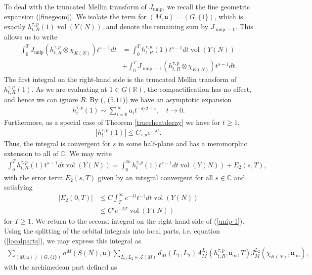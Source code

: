 \documentclass[11pt,reqno]{amsart}
\numberwithin{equation}{section}
\theoremstyle{definition}
\theoremstyle{remark}
\newcommand{\vol}{\operatorname{vol}}
\newcommand{\unip}{\operatorname{unip}}
\newcommand{\mf}[1]{\mathfrak{#1}}
\newcommand{\C}{\mathbb{C}}
\newcommand{\R}{\mathbb{R}}
\begin{document}
To deal with the truncated Mellin transform of $J_{\unip}$, we recall the fine geometric expansion (\ref{finegeom}). We isolate the term for $(M,\mf{u})=(G,\lbrace 1\rbrace)$, which is exactly $h^{\tau,p}_{t,R}(1)\vol(Y(N))$, and denote the remaining sum by $J_{\unip-1}$. This allows us to write
\begin{align}\label{unip-1}
    \int_0^T J_{\unip}(h^{\tau,p}_{t,R}\otimes\chi_{K(N)})t^{s-1}dt &= \int_0^T h_{t,R}^{\tau,p}(1)t^{s-1}dt \vol(Y(N)) \\
    &+\int_0^T J_{\unip-1}(h^{\tau,p}_{t,R}\otimes\chi_{K(N)})t^{s-1}dt .
\end{align}
The first integral on the right-hand side is the truncated Mellin transform of $h_{t,R}^{\tau,p}(1)$. As we are evaluating at $1\in G(\R)$, the compactification has no effect, and hence we can ignore $R$. By (\cite{MzM1}, ($5.11$)) we have an asymptotic expansion
\begin{align*}
    h_t^{\tau,p}(1)\sim \sum_{i=0}^\infty a_i t^{-d/2+i}, \quad t\to 0.
\end{align*}
Furthermore, as a special case of Theorem \ref{traceheatdecay} we have for $t\geq 1$,
\begin{align*}
    |h_t^{\tau,p}(1)|\leq C_{\tau,p}e^{-\lambda t}.
\end{align*}
Thus, the integral is convergent for $s$ in some half-plane and has a meromorphic extension to all of $\C$. We may write
\begin{align*}
    \int_0^T h_{t,R}^{\tau,p}(1)t^{s-1}dt \vol(Y(N)) = \int_0^\infty h_t^{\tau,p}(1)t^{s-1}dt \vol(Y(N)) + E_2(s,T),
\end{align*}
with the error term $E_2(s,T)$ given by an integral convergent for all $s\in\C$ and satisfying
\begin{align}\label{error2}
    |E_2(0,T)|&\leq C\int_T^\infty e^{-\lambda t}t^{-1}dt \vol(Y(N)) \\
    &\leq C'e^{-\lambda T}\vol(Y(N))
\end{align}
for $T\geq 1$. We return to the second integral on the right-hand side of (\ref{unip-1}). Using the splitting of the orbital integrals into local parts, i.e. equation (\ref{localparts}), we may express this integral as
\begin{align}\label{expansioncalc}
    \sum_{(M,\mf{u})\neq(G,\lbrace 1\rbrace)}a^M(S(N),\mf{u})\sum_{L_1,L_2\in \mathcal{L}(M)}d_M(L_1,L_2)A_M^{L_1}(h^{\tau,p}_{t,R},\mf{u}_\infty,T)J_M^{L_2}(\chi_{K(N)},\mf{u}_{\text{fin}}),
\end{align}
with the archimedean part defined as 
\end{document}
